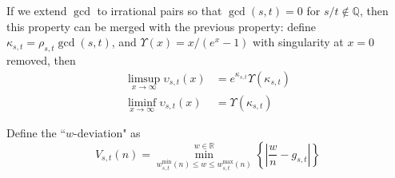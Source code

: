 \documentclass[]{article}
\begin{document}
If we extend $\gcd$ to irrational pairs so that $\gcd(s, t) = 0$ for $s/t\notin \mathbb{Q}$, then this property can be merged with the previous property: define $\kappa_{s,t} = \rho_{s,t} \gcd(s, t)$, and $\Upsilon(x) = x/(e^x-1)$ with singularity at $x=0$ removed, then
\begin{align*}
	\limsup_{x\to\infty} \upsilon_{s,t}(x) &= e^{\kappa_{s,t}}\Upsilon(\kappa_{s,t}) \\
	\liminf_{x\to\infty} \upsilon_{s,t}(x) &= \Upsilon(\kappa_{s,t})
\end{align*}

\vspace{1cm}
\begin{definition}[$w$ deviation]
	Define the ``$w$-deviation" as
	\[
	V_{s,t}(n) = \min_{w_{s,t}^{\min}(n)\le w \le w_{s,t}^{\max}(n)}^{w\in\mathbb{R}} \left\{ \left|\frac{w}{n} - g_{s,t}\right| \right\}
	\]
\end{definition}
\end{document}
